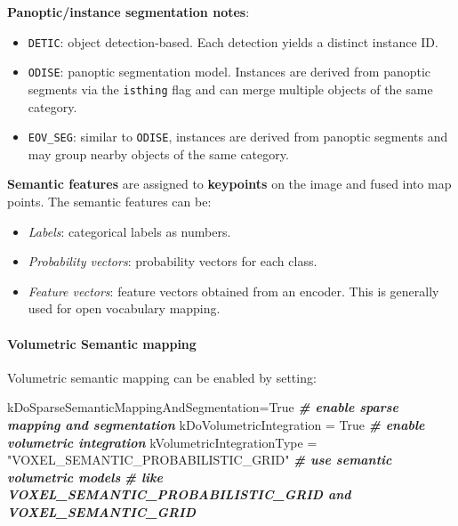 \documentclass{article}
\newenvironment{Shaded}{\begin{snugshade}}{\end{snugshade}}
\newcommand{\AttributeTok}[1]{\textcolor[rgb]{0.74,0.68,0.62}{#1}}
\newcommand{\CommentTok}[1]{\textcolor[rgb]{0.00,0.40,1.00}{\textbf{\textit{#1}}}}
\newcommand{\DecValTok}[1]{\textcolor[rgb]{0.27,0.67,0.26}{#1}}
\newcommand{\FunctionTok}[1]{\textcolor[rgb]{1.00,0.58,0.35}{\textbf{#1}}}
\newcommand{\NormalTok}[1]{\textcolor[rgb]{0.74,0.68,0.62}{#1}}
\newcommand{\OperatorTok}[1]{\textcolor[rgb]{0.74,0.68,0.62}{#1}}
\newcommand{\StringTok}[1]{\textcolor[rgb]{0.02,0.61,0.04}{#1}}
\newcommand{\VariableTok}[1]{\textcolor[rgb]{0.74,0.68,0.62}{#1}}
\let\oldparagraph\paragraph
\renewcommand{\paragraph}[1]{\oldparagraph{#1}\mbox{}}
\begin{document}
\textbf{Panoptic/instance segmentation notes}:
\begin{itemize}
\item \texttt{DETIC}: object detection-based. Each detection yields a distinct instance ID.
\item \texttt{ODISE}: panoptic segmentation model. Instances are derived from panoptic segments via the \texttt{isthing} flag and can merge multiple objects of the same category.
\item \texttt{EOV\_SEG}: similar to \texttt{ODISE}, instances are derived from panoptic segments and may group nearby objects of the same category.
\end{itemize}

\textbf{Semantic features} are assigned to \textbf{keypoints} on the
image and fused into map points. The semantic features can be:
\begin{itemize}
\item \textit{Labels}: categorical labels as numbers.
\item \textit{Probability vectors}: probability vectors for each class.
\item \textit{Feature vectors}: feature vectors
obtained from an encoder. This is generally used for open vocabulary
mapping.
\end{itemize}

\hypertarget{volumetric-semantic-mapping}{%
\paragraph{Volumetric Semantic
mapping}\label{volumetric-semantic-mapping}}

Volumetric semantic mapping can be enabled by setting:

\begin{scriptsize}
\begin{Shaded}
\begin{Highlighting}[]
\NormalTok{kDoSparseSemanticMappingAndSegmentation}\OperatorTok{=}\VariableTok{True} \CommentTok{#  enable sparse mapping and segmentation}
\NormalTok{kDoVolumetricIntegration }\OperatorTok{=} \VariableTok{True} \CommentTok{# enable volumetric integration}
\NormalTok{kVolumetricIntegrationType }\OperatorTok{=} \StringTok{"VOXEL_SEMANTIC_PROBABILISTIC_GRID"} \CommentTok{# use semantic volumetric models }
\FunctionTok{}\AttributeTok{ }\DecValTok{}\AttributeTok{  }\CommentTok{                                                      # like VOXEL_SEMANTIC_PROBABILISTIC_GRID and VOXEL_SEMANTIC_GRID}
\end{Highlighting}
\end{Shaded}
\end{scriptsize}
\end{document}
